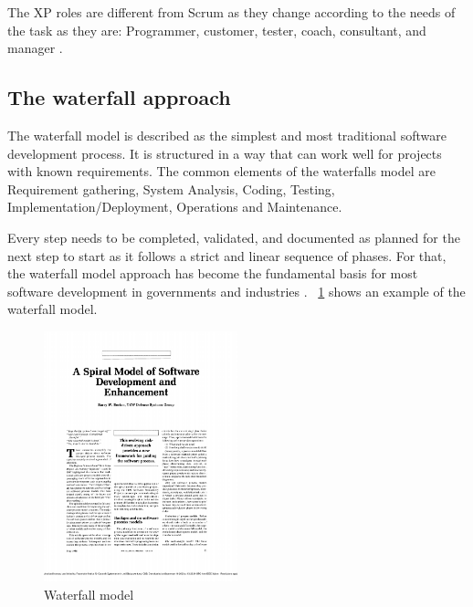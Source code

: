 \documentclass[article,onecolumn]{IEEEtran}
\begin{document}
The XP roles are different from Scrum as they change according to the needs of the task as they are: Programmer, customer, tester, coach, consultant, and manager \cite{a4}.
 
\subsection{The waterfall approach}
The waterfall model is described as the simplest and most traditional software development process. It is structured in a way that can work well for projects with known requirements. 
The common elements of the waterfalls model are Requirement gathering, System Analysis, Coding, Testing, Implementation/Deployment, Operations and Maintenance.

Every step needs to be completed, validated, and documented as planned for the next step to start as it follows a strict and linear sequence of phases. For that, the waterfall model approach has become the fundamental basis for most software development in governments and industries \cite{a5}.
\figurename~\ref{fig:waterfall} shows an example of the waterfall model.

\begin{figure}[htb]
	\centering
	\includegraphics[width=0.5\textwidth, page=2, clip,trim=4cm 8.5cm 4cm 3cm]{Figures/paper_models.pdf}
	\caption{Waterfall model \cite[p.62]{a6}}
	\label{fig:waterfall}
\end{figure}
\end{document}
